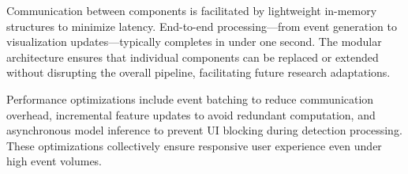 Communication between components is facilitated by lightweight in-memory structures to minimize latency. End-to-end processing—from event generation to visualization updates—typically completes in under one second. The modular architecture ensures that individual components can be replaced or extended without disrupting the overall pipeline, facilitating future research adaptations.

Performance optimizations include event batching to reduce communication overhead, incremental feature updates to avoid redundant computation, and asynchronous model inference to prevent UI blocking during detection processing. These optimizations collectively ensure responsive user experience even under high event volumes.
